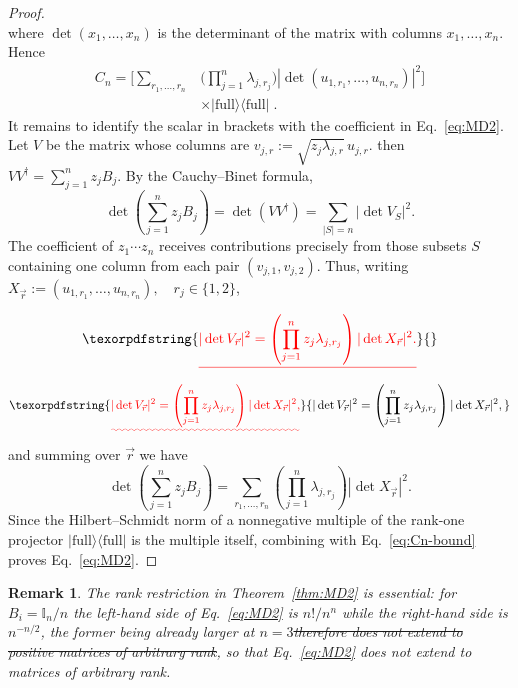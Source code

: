 \documentclass[prx,twocolumn,superscriptaddress,aps,10pt, frontmatterverbose, reprint,footinbib,longbibliography=true]{revtex4-2}
\newtheorem{remark}{Remark}
\providecommand{\DIFaddtex}[1]{{\protect\color{red}\uwave{#1}}} %
\providecommand{\DIFdeltex}[1]{{\protect\color{red}\sout{#1}}}                      %
\providecommand{\DIFaddbegin}{\protect\color{red}} %
\providecommand{\DIFaddend}{\protect\color{black}} %
\providecommand{\DIFdelbegin}{} %
\providecommand{\DIFdelend}{} %
\providecommand{\DIFadd}[1]{\texorpdfstring{\DIFaddtex{#1}}{#1}} %
\providecommand{\DIFdel}[1]{\texorpdfstring{\DIFdeltex{#1}}{}} %
\newcommand{\DIFscaledelfig}{0.5}
\newlength{\DIFdelgraphicswidth} %
\newlength{\DIFdelgraphicsheight} %
\newcommand{\DIFaddincludegraphics}[2][]{{\color{blue}\fbox{\DIFOincludegraphics[#1]{#2}}}} %
\newcommand{\DIFdelincludegraphics}[2][]{%
\sbox{\DIFdelgraphicsbox}{\DIFOincludegraphics[#1]{#2}}%
\settoboxwidth{\DIFdelgraphicswidth}{\DIFdelgraphicsbox} %
\settoboxtotalheight{\DIFdelgraphicsheight}{\DIFdelgraphicsbox} %
\scalebox{\DIFscaledelfig}{%
\parbox[b]{\DIFdelgraphicswidth}{\usebox{\DIFdelgraphicsbox}\\[-\baselineskip] \rule{\DIFdelgraphicswidth}{0em}}\llap{\resizebox{\DIFdelgraphicswidth}{\DIFdelgraphicsheight}{%
\setlength{\unitlength}{\DIFdelgraphicswidth}%
\begin{picture}(1,1)%
\thicklines\linethickness{2pt} %
{\color[rgb]{1,0,0}\put(0,0){\framebox(1,1){}}}%
{\color[rgb]{1,0,0}\put(0,0){\line( 1,1){1}}}%
{\color[rgb]{1,0,0}\put(0,1){\line(1,-1){1}}}%
\end{picture}%
}\hspace*{3pt}}} %
} %
\DeclareRobustCommand{\DIFaddbegin}{\DIFOaddbegin \let\includegraphics\DIFaddincludegraphics} %
\DeclareRobustCommand{\DIFaddend}{\DIFOaddend \let\includegraphics\DIFOincludegraphics} %
\DeclareRobustCommand{\DIFdelbegin}{\DIFOdelbegin \let\includegraphics\DIFdelincludegraphics} %
\DeclareRobustCommand{\DIFdelend}{\DIFOaddend \let\includegraphics\DIFOincludegraphics} %
\begin{document}
\begin{proof}
\begin{equation}
{}\end{equation}\DIFaddend 
where $\det(x_1,\dots,x_n)$ is the determinant of the matrix with columns $x_1,\dots,x_n$. Hence
\begin{equation}
\begin{split}C_n=\Big[\sum_{r_1,\dots,r_n}&\Big(\prod_{j=1}^n\lambda_{j,r_j}\Big)\left|\det(u_{1,r_1},\dots,u_{n,r_n})\right|^2\Big]\\
    &\times|\mathrm{full}\rangle\langle\mathrm{full}|\;.
\end{split}
\label{eq:Cn-scalar}
\end{equation}
It remains to identify the scalar in brackets with the coefficient in Eq.~\eqref{eq:MD2}. 
Let $V$ be the matrix whose columns are \DIFdelbegin \DIFdel{$v_{j,r}:=\sqrt{z_j\lambda_{j,r}}\,u_{j,r}.$
}\DIFdelend \DIFaddbegin \DIFadd{$v_{j,r}:=\sqrt{z_j\lambda_{j,r}}\,u_{j,r}$;
}\DIFaddend then $VV^\dagger=\sum_{j=1}^n z_jB_j$. By the Cauchy--Binet formula,
\begin{equation}
    \det\!\left(\sum_{j=1}^n z_jB_j\right)
=\det(VV^\dagger)
=\sum_{|S|=n} |\det V_S|^2 .
\end{equation}
The coefficient of $z_1\cdots z_n$ receives contributions precisely from
those subsets $S$ containing one column from each pair $(v_{j,1},v_{j,2})$. Thus, writing $X_{\vec r}:=(u_{1,r_1},\ldots,u_{n,r_n}),
\quad r_j\in\{1,2\}$,

\DIFdelbegin \begin{displaymath}
    \DIFdel{|\det V_{\vec r}|^2
=
\left(\prod_{j=1}^n z_j\lambda_{j,r_j}\right)
|\det X_{\vec r}|^2.
}\end{displaymath}%
\DIFdelend \DIFaddbegin \begin{equation}
    \DIFadd{|\det V_{\vec r}|^2
=
\left(\prod_{j=1}^n z_j\lambda_{j,r_j}\right)
|\det X_{\vec r}|^2,
}\end{equation}\DIFaddend 
and summing over $\vec{r}$ we have
\begin{equation}
    [z_1\cdots z_n]\det\!\left(\sum_{j=1}^n z_jB_j\right)
=
\sum_{r_1,\ldots,r_n}
\left(\prod_{j=1}^n\lambda_{j,r_j}\right)
|\det X_{\vec r}|^2.
\end{equation}
Since the Hilbert--Schmidt norm of a nonnegative multiple of the rank-one projector $|\mathrm{full}\rangle\langle\mathrm{full}|$ is the multiple itself, combining with Eq.~\eqref{eq:Cn-bound} proves Eq.~\eqref{eq:MD2}. \end{proof}

\begin{remark}
The rank restriction in Theorem~\ref{thm:MD2} is essential: for $B_i=\mathbb{I}_n/n$ the left-hand side of Eq.~\eqref{eq:MD2} is $n!/n^n$ while the right-hand side is $n^{-n/2}$, the former being already larger at $n=3$\DIFdelbegin \DIFdel{therefore does not extend to positive matrices of arbitrary rank}\DIFdelend , so that Eq.~\eqref{eq:MD2} does not extend to \DIFaddbegin \DIFadd{positive }\DIFaddend matrices of arbitrary rank.\end{remark}
\end{document}
